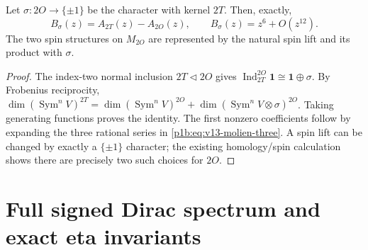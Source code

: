 \documentclass[11pt]{article}
\begin{document}
\begin{proposition}
\label{p1b:prop:v13-octa-sign-molien}
Let $\sigma:2O\to\{\pm1\}$ be the character with kernel $2T$.
Then, exactly,
\begin{equation}
\label{p1b:eq:v13-octa-sign-series}
 B_\sigma(z)=A_{2T}(z)-A_{2O}(z),
 \qquad B_\sigma(z)=z^6+O(z^{12}).
\end{equation}
The two spin structures on $M_{2O}$ are represented by the natural
spin lift and its product with $\sigma$.
\end{proposition}
\begin{proof}
The index-two normal inclusion $2T\triangleleft2O$ gives
$\operatorname{Ind}_{2T}^{2O}\mathbf1\cong\mathbf1\oplus\sigma$.
By Frobenius reciprocity,
$\dim(\operatorname{Sym}^nV)^{2T}
 =\dim(\operatorname{Sym}^nV)^{2O}
 +\dim(\operatorname{Sym}^nV\otimes\sigma)^{2O}$.
Taking generating functions proves the identity.  The first nonzero
coefficients follow by expanding the three rational series in
\eqref{p1b:eq:v13-molien-three}.  A spin lift can be changed by
exactly a $\{\pm1\}$ character; the existing homology/spin calculation
shows there are precisely two such choices for $2O$.
\end{proof}

\section{Full signed Dirac spectrum and exact eta invariants}
\label{p1b:sec:v13-dirac}
\end{document}
